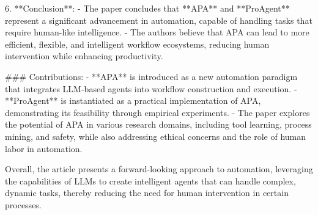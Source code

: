 6. **Conclusion**:
   - The paper concludes that **APA** and **ProAgent** represent a significant advancement in automation, capable of handling tasks that require human-like intelligence.
   - The authors believe that APA can lead to more efficient, flexible, and intelligent workflow ecosystems, reducing human intervention while enhancing productivity.

### Contributions:
- **APA** is introduced as a new automation paradigm that integrates LLM-based agents into workflow construction and execution.
- **ProAgent** is instantiated as a practical implementation of APA, demonstrating its feasibility through empirical experiments.
- The paper explores the potential of APA in various research domains, including tool learning, process mining, and safety, while also addressing ethical concerns and the role of human labor in automation.

Overall, the article presents a forward-looking approach to automation, leveraging the capabilities of LLMs to create intelligent agents that can handle complex, dynamic tasks, thereby reducing the need for human intervention in certain processes.

